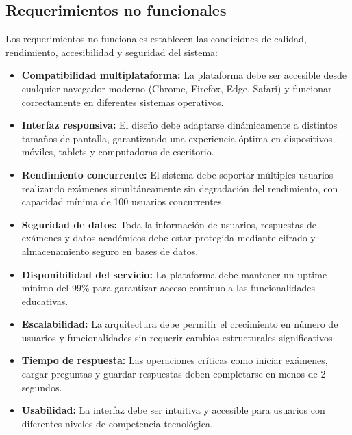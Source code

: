 \documentclass[12pt,a4paper]{report}
\begin{document}
\subsection{Requerimientos no funcionales}

Los requerimientos no funcionales establecen las condiciones de calidad, rendimiento, accesibilidad y seguridad del sistema:

\begin{itemize}
\item \textbf{Compatibilidad multiplataforma:} La plataforma debe ser accesible desde cualquier navegador moderno (Chrome, Firefox, Edge, Safari) y funcionar correctamente en diferentes sistemas operativos.

\item \textbf{Interfaz responsiva:} El diseño debe adaptarse dinámicamente a distintos tamaños de pantalla, garantizando una experiencia óptima en dispositivos móviles, tablets y computadoras de escritorio.

\item \textbf{Rendimiento concurrente:} El sistema debe soportar múltiples usuarios realizando exámenes simultáneamente sin degradación del rendimiento, con capacidad mínima de 100 usuarios concurrentes.

\item \textbf{Seguridad de datos:} Toda la información de usuarios, respuestas de exámenes y datos académicos debe estar protegida mediante cifrado y almacenamiento seguro en bases de datos.

\item \textbf{Disponibilidad del servicio:} La plataforma debe mantener un uptime mínimo del 99\% para garantizar acceso continuo a las funcionalidades educativas.

\item \textbf{Escalabilidad:} La arquitectura debe permitir el crecimiento en número de usuarios y funcionalidades sin requerir cambios estructurales significativos.

\item \textbf{Tiempo de respuesta:} Las operaciones críticas como iniciar exámenes, cargar preguntas y guardar respuestas deben completarse en menos de 2 segundos.

\item \textbf{Usabilidad:} La interfaz debe ser intuitiva y accesible para usuarios con diferentes niveles de competencia tecnológica.
\end{itemize}
\end{document}
